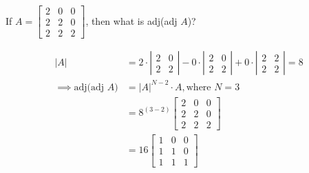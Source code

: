 

\question[2] If $A = \left[ 
  \begin{array}{ccc}
    2 & 0 & 0 \\
    2 & 2 & 0 \\
    2 & 2 & 2
  \end{array}
\right]$, then what is adj(adj $A$)?


\ifprintanswers
\fi 

\begin{solution}[\halfpage]
  \begin{align}
    |A| &= 2\cdot\left| \begin{array}{cc}
      2 & 0 \\
      2 & 2
    \end{array}\right| - 0\cdot\left| \begin{array}{cc}
      2 & 0 \\
      2 & 2
    \end{array}\right| + 0\cdot\left| \begin{array}{cc}
      2 & 2 \\
      2 & 2
    \end{array}\right| = 8 \\
    \implies \text{adj(adj $A$)} &= |A|^{N-2}\cdot A, \text{where } N = 3 \\
            &= 8^{(3-2)}\left[
              \begin{array}{ccc}
                2 & 0 & 0 \\
                2 & 2 & 0 \\
                2 & 2 & 2
              \end{array}
            \right] \\
            &= 16\left[
              \begin{array}{ccc}
                1 & 0 & 0 \\
                1 & 1 & 0 \\
                1 & 1 & 1
              \end{array}
            \right]
  \end{align}
\end{solution}
